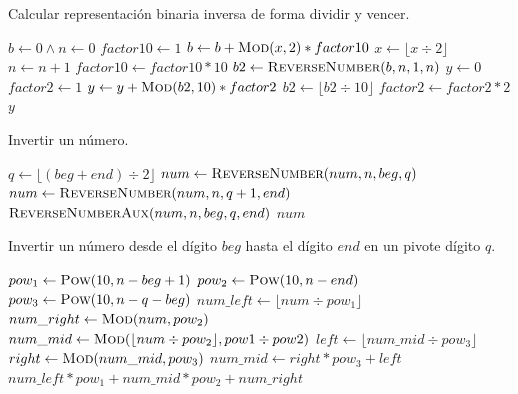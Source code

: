 \documentclass[letter]{article}
\begin{document}
\begin{algorithm}[!ht]
\caption{Calcular representación binaria inversa de forma dividir y vencer.}
\begin{algorithmic}[1] 
    \State $b \leftarrow 0 \land n \leftarrow 0$
    \State $factor10 \leftarrow 1$
        \State $b \leftarrow b + \Call{Mod}{x, 2} * factor10$
        \State $x \leftarrow \lfloor x \div 2 \rfloor$
        \State $n \leftarrow n + 1$
        \State $factor10 \leftarrow factor10 * 10$
    \EndWhile
    \State $b2 \leftarrow \Call{ReverseNumber}{b, n, 1, n}$
    \State $y \leftarrow 0$
    \State $factor2 \leftarrow 1$
        \State $y \leftarrow y + \Call{Mod}{b2, 10} * factor2$
        \State $b2 \leftarrow \lfloor b2 \div 10 \rfloor$
        \State $factor2 \leftarrow factor2 * 2$
    \EndWhile
    \State \Return $y$
\EndProcedure
\end{algorithmic}
\end{algorithm}

\begin{algorithm}[!ht]
\caption{Invertir un número.}
\begin{algorithmic}[1] 
        \State $q \leftarrow \lfloor (beg + end) \div 2 \rfloor$
        \State $num \leftarrow \Call{ReverseNumber}{num, n, beg, q}$
        \State $num \leftarrow \Call{ReverseNumber}{num, n, q + 1, end}$
        \State \Return $\Call{ReverseNumberAux}{num, n, beg, q, end}$
    \Else
        \State \Return $num$
    \EndIf
\EndProcedure
\end{algorithmic}
\end{algorithm}

\begin{algorithm}[!ht]
\caption{Invertir un número desde el dígito $beg$ hasta el dígito $end$ en un pivote dígito $q$.}
\begin{algorithmic}[1] 
    \State $pow_1 \leftarrow \Call{Pow}{10, n - beg + 1}$
    \State $pow_2 \leftarrow \Call{Pow}{10, n - end}$
    \State $pow_3 \leftarrow \Call{Pow}{10, n - q - beg}$
    \State $num\_left \leftarrow \lfloor num \div pow_1 \rfloor$
    \State $num\_right \leftarrow  \Call{Mod}{num, pow_2}$
    \State $num\_mid \leftarrow \Call{Mod}{\lfloor num \div pow_2 \rfloor, pow1 \div pow2}$
    \State $left \leftarrow \lfloor num\_mid \div pow_3 \rfloor$
    \State $right \leftarrow \Call{Mod}{num\_mid, pow_3}$
    \State $num\_mid \leftarrow right * pow_3 + left$
    \State \Return $num\_left * pow_1 + num\_mid * pow_2 + num\_right$
\EndProcedure
\end{algorithmic}
\end{algorithm}
\end{document}
